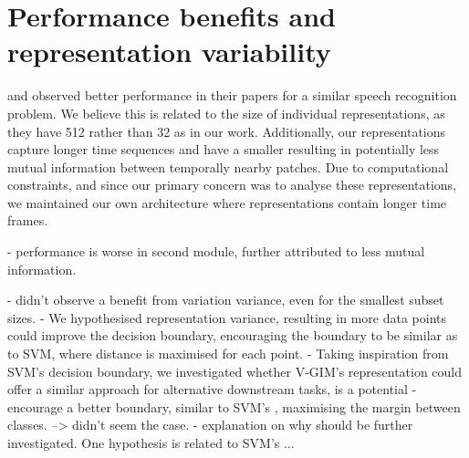 		
		




		
\section{Performance benefits and representation variability}
		\cite{oordRepresentationLearningContrastive2019} and \cite{lowePuttingEndEndtoEnd2020} observed better performance in their papers for a similar speech recognition problem. We believe this is related to the size of individual representations, as they have 512 rather than 32 as in our work. Additionally, our representations capture longer time sequences and have a smaller resulting in potentially less mutual information between temporally nearby patches. Due to computational constraints, and since our primary concern was to analyse these representations, we maintained our own architecture where representations contain longer time frames.


		- performance is worse in second module, further attributed to less mutual information.

		- didn't observe a benefit from variation variance, even for the smallest subset sizes.
		- We hypothesised representation variance, resulting in more data points could improve the decision boundary, encouraging the boundary to be similar as to SVM, where distance is maximised for each point.
		- Taking inspiration from SVM's decision boundary, we investigated whether V-GIM's representation could offer a similar approach for alternative downstream tasks, is a potential 
			- encourage a better boundary, similar to SVM's \citep{hearstSupportVectorMachines1998, nobleWhatSupportVector2006}, maximising the margin between classes.
			 --> didn't seem the case.
		- explanation on why should be further investigated. One hypothesis is related to SVM's ...
		
